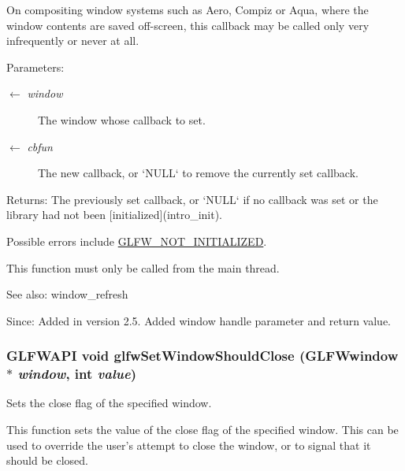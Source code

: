 On compositing window systems such as Aero, Compiz or Aqua, where the window contents are saved off-screen, this callback may be called only very infrequently or never at all.

\begin{Desc}
\item[Parameters:]
\begin{description}
\item[\mbox{$\leftarrow$} {\em window}]The window whose callback to set. \item[\mbox{$\leftarrow$} {\em cbfun}]The new callback, or `NULL` to remove the currently set callback. \end{description}
\end{Desc}
\begin{Desc}
\item[Returns:]The previously set callback, or `NULL` if no callback was set or the library had not been \mbox{[}initialized\mbox{]}(intro\_\-init).\end{Desc}
Possible errors include \hyperlink{group__errors_g2374ee02c177f12e1fa76ff3ed15e14a}{GLFW\_\-NOT\_\-INITIALIZED}.

This function must only be called from the main thread.

\begin{Desc}
\item[See also:]window\_\-refresh\end{Desc}
\begin{Desc}
\item[Since:]Added in version 2.5.  Added window handle parameter and return value. \end{Desc}
\hypertarget{group__window_g1cadeda7a1e2f224e06a8415d30741aa}{
\subsubsection[glfwSetWindowShouldClose]{\setlength{\rightskip}{0pt plus 5cm}GLFWAPI void glfwSetWindowShouldClose ({\bf GLFWwindow} $\ast$ {\em window}, \/  int {\em value})}}
\label{group__window_g1cadeda7a1e2f224e06a8415d30741aa}


Sets the close flag of the specified window. 

This function sets the value of the close flag of the specified window. This can be used to override the user's attempt to close the window, or to signal that it should be closed.

